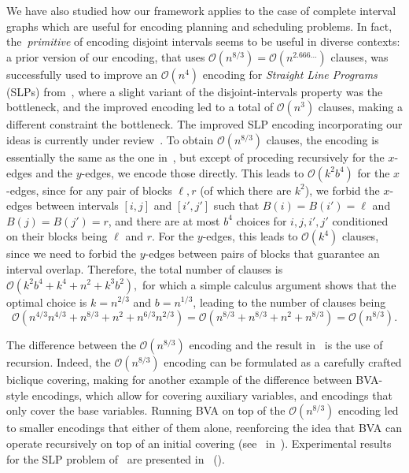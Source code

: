 \documentclass[11pt]{article}
\renewcommand{\O}{\mathcal{O}}
\begin{document}
We have also studied how our framework applies to the case of complete interval graphs which are useful for encoding planning and scheduling problems. 
In fact, the~\emph{primitive} of encoding disjoint intervals seems to be useful in diverse contexts: a prior version of our encoding, that uses $\O(n^{8/3}) = \O(n^{2.666\ldots})$ clauses, was successfully used to improve an $\O(n^4)$ encoding for \emph{Straight Line Programs} (SLPs) from~\citet{bannai_et_al:LIPIcs.ESA.2022.12}, where a slight variant of the disjoint-intervals property was the bottleneck, and the improved encoding led to a total of $\O(n^3)$ clauses, making a different constraint the bottleneck. The improved SLP encoding incorporating our ideas is currently under review~\citep{bannaiAndMe}. 
To obtain $\O(n^{8/3})$ clauses, the encoding is essentially the same as the one in~, but except of proceding recursively for the $x$-edges and the $y$-edges, we encode those directly. 
This leads to $\O(k^2 b^4)$ for the $x$-edges, since for any pair of blocks $\ell, r$ (of which there are $k^2$), we forbid the $x$-edges between intervals $[i, j]$ and $[i', j']$ such that $B(i) = B(i') = \ell$ and $B(j) = B(j') = r$, and there are at most $b^4$ choices for $i, j, i', j'$ conditioned on their blocks being $\ell$ and $r$.
For the $y$-edges, this leads to $\O(k^4)$ clauses, since we need to forbid the $y$-edges between pairs of blocks that guarantee an interval overlap.
Therefore, the total number of clauses is 
\(
    \O(k^2 b^4 + k^4 + n^2 + k^3 b^2), 
\)
for which a simple calculus argument shows that the optimal choice is $k = n^{2/3}$ and $b = n^{1/3}$, leading to the number of clauses being 
\[
\O(n^{4/3} n^{4/3} + n^{8/3} + n^2 + n^{6/3} n^{2/3}) = \O(n^{8/3} + n^{8/3} + n^2 + n^{8/3}) = \O(n^{8/3}).
\]


The difference between the $\O(n^{8/3})$ encoding and the result in~ is the use of recursion. Indeed, the $\O(n^{8/3})$ encoding can be formulated as a carefully crafted biclique covering, making for another example of the difference between BVA-style encodings, which allow for covering auxiliary variables, and encodings that only cover the base variables.
Running BVA on top of the $\O(n^{8/3})$ encoding led to smaller encodings that either of them alone, reenforcing the idea that BVA can operate recursively on top of an initial covering (see~ in~). 
 Experimental results for the SLP problem of~\citet{bannai_et_al:LIPIcs.ESA.2022.12} are presented in~ ().
\end{document}
